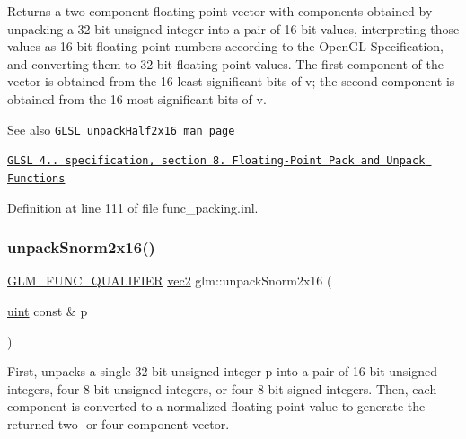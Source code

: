 Returns a two-\/component floating-\/point vector with components obtained by unpacking a 32-\/bit unsigned integer into a pair of 16-\/bit values, interpreting those values as 16-\/bit floating-\/point numbers according to the Open\+GL Specification, and converting them to 32-\/bit floating-\/point values. The first component of the vector is obtained from the 16 least-\/significant bits of v; the second component is obtained from the 16 most-\/significant bits of v.

\begin{DoxySeeAlso}{See also}
\href{http://www.opengl.org/sdk/docs/manglsl/xhtml/unpackHalf2x16.xml}{\tt G\+L\+SL unpack\+Half2x16 man page} 

\href{http://www.opengl.org/registry/doc/GLSLangSpec.4.20.8.pdf}{\tt G\+L\+SL 4.. specification, section 8. Floating-\/\+Point Pack and Unpack Functions} 
\end{DoxySeeAlso}


Definition at line 111 of file func\+\_\+packing.\+inl.

\mbox{\label{group__core__func__packing_gaa3f9bd6a71d7bdfab090b9626f2466aa}} 
\subsubsection{\texorpdfstring{unpack\+Snorm2x16()}{unpackSnorm2x16()}}
{\footnotesize\ttfamily \hyperlink{setup_8hpp_a33fdea6f91c5f834105f7415e2a64407}{G\+L\+M\+\_\+\+F\+U\+N\+C\+\_\+\+Q\+U\+A\+L\+I\+F\+I\+ER} \hyperlink{group__core__types_gaa1618f51db67eaa145db101d8c8431d8}{vec2} glm\+::unpack\+Snorm2x16 (\begin{DoxyParamCaption}\item[{\hyperlink{group__core__precision_ga4fd29415871152bfb5abd588334147c8}{uint} const \&}]{p }\end{DoxyParamCaption})}

First, unpacks a single 32-\/bit unsigned integer p into a pair of 16-\/bit unsigned integers, four 8-\/bit unsigned integers, or four 8-\/bit signed integers. Then, each component is converted to a normalized floating-\/point value to generate the returned two-\/ or four-\/component vector.

